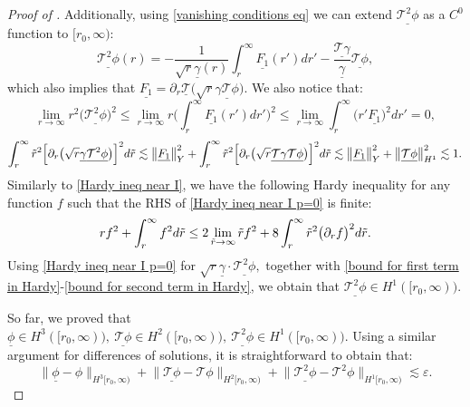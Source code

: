 \documentclass[11pt]{article}
\numberwithin{equation}{section}
\begin{document}
\begin{proof}[Proof of ]
Additionally, using \eqref{vanishing conditions eq} we can extend $\underline{\mathcal{T}^2\phi}$ as a $C^0$ function to $[r_0,\infty)$:
\[\underline{\mathcal{T}^2\phi}(r)=-\frac{1}{\sqrt{r}\underline{\gamma}(r)}\int_r^{\infty}\underline{F_1}(r')dr'-\frac{\underline{\mathcal{T}\gamma}}{\underline{\gamma}}\underline{\mathcal{T}\phi},\]
which also implies that $\underline{F_1}=\partial_r\underline{\mathcal{T}}\big(\sqrt{r}\underline{\gamma\mathcal{T}\phi}\big).$ We also notice that:
\begin{equation}\label{bound for first term in Hardy}
    \lim_{r\rightarrow\infty}r^2\big(\underline{\mathcal{T}^2\phi}\big)^2\leq\lim_{r\rightarrow\infty}r\bigg(\int_r^{\infty}\underline{F_1}(r')dr'\bigg)^2\leq\lim_{r\rightarrow\infty}\int_r^{\infty}\big(r'\underline{F_1}\big)^2dr'=0,
\end{equation}
\begin{equation}\label{bound for second term in Hardy}
    \int_r^{\infty}\Tilde{r}^2\Big[\partial_r\big(\sqrt{r}\underline{\gamma}\underline{\mathcal{T}^2\phi}\big)\Big]^2d\Tilde{r}\lesssim\big\|\underline{F_1}\big\|_{Y}^2+\int_r^{\infty}\Tilde{r}^2\Big[\partial_r\big(\sqrt{r}\underline{\mathcal{T}\gamma}\underline{\mathcal{T}\phi}\big)\Big]^2d\Tilde{r}\lesssim\big\|\underline{F_1}\big\|_{Y}^2+\big\|\underline{\mathcal{T}\phi}\big\|_{H^1}^2\lesssim1.
\end{equation}
Similarly to \eqref{Hardy ineq near I}, we have the following Hardy inequality for any function $f$ such that the RHS of \eqref{Hardy ineq near I p=0} is finite:
\begin{equation}\label{Hardy ineq near I p=0}
    rf^2+\int_r^{\infty}f^2d\Tilde{r}\leq2\lim_{\Tilde{r}\rightarrow\infty}\Tilde{r}f^2+ 8\int_r^{\infty}\Tilde{r}^2\big(\partial_rf\big)^2d\Tilde{r}.
\end{equation}
Using \eqref{Hardy ineq near I p=0} for $\sqrt{r}\underline{\gamma}\cdot\underline{\mathcal{T}^2\phi},$ together with \eqref{bound for first term in Hardy}-\eqref{bound for second term in Hardy}, we obtain that $\underline{\mathcal{T}^2\phi}\in H^1([r_0,\infty)).$ 

So far, we proved that $\underline{\phi}\in H^3([r_0,\infty)),\ \underline{\mathcal{T}\phi}\in H^2([r_0,\infty)),\ \underline{\mathcal{T}^2\phi}\in H^1([r_0,\infty)).$ Using a similar argument for differences of solutions, it is straightforward to obtain that:
\begin{equation}\label{main difference estimate for extension}
    \big\|\underline{\phi}-\phi\big\|_{H^3[r_0,\infty)}+\big\|\underline{\mathcal{T}\phi}-\mathcal{T}\phi\big\|_{H^2[r_0,\infty)}+\big\|\underline{\mathcal{T}^2\phi}-\mathcal{T}^2\phi\big\|_{H^1[r_0,\infty)}\lesssim\varepsilon.
\end{equation}


\end{proof}
\end{document}
